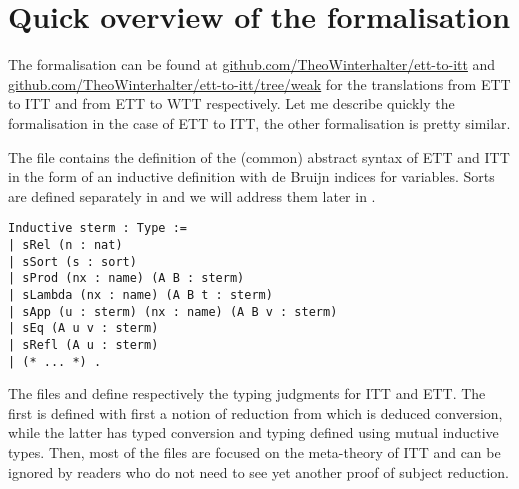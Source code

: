 \section{Quick overview of the formalisation}

The formalisation can be found at
\href{https://github.com/TheoWinterhalter/ett-to-itt}{github.com/TheoWinterhalter/ett-to-itt}
and
\href{https://github.com/TheoWinterhalter/ett-to-itt/tree/weak}{github.com/TheoWinterhalter/ett-to-itt/tree/weak}
for the translations from \acrshort{ETT} to \acrshort{ITT} and from
\acrshort{ETT} to \acrshort{WTT} respectively.
Let me describe quickly the formalisation in the case of \acrshort{ETT} to
\acrshort{ITT}, the other formalisation is pretty similar.

The file  contains the definition of the (common) abstract syntax
of \acrshort{ETT} and \acrshort{ITT} in the form of an inductive definition with
de Bruijn indices for variables.
Sorts are defined separately in  and we will address them later
in .

\begin{verbatim}
Inductive sterm : Type :=
| sRel (n : nat)
| sSort (s : sort)
| sProd (nx : name) (A B : sterm)
| sLambda (nx : name) (A B t : sterm)
| sApp (u : sterm) (nx : name) (A B v : sterm)
| sEq (A u v : sterm)
| sRefl (A u : sterm)
| (* ... *) .
\end{verbatim}

The files  and  define respectively the
typing judgments for \acrshort{ITT} and \acrshort{ETT}.
The first is defined with first a notion of reduction from which is deduced
conversion, while the latter has typed conversion and typing defined using
mutual inductive types.
Then, most of the files are focused on the meta-theory of \acrshort{ITT} and can
be ignored by readers who do not need to see yet another proof of subject
reduction.


